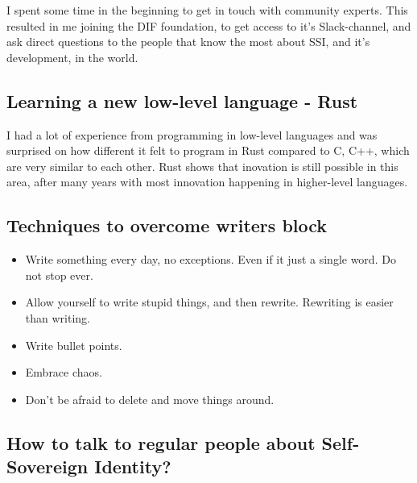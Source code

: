 I spent some time in the beginning to get in touch with community experts. This resulted in me joining the DIF foundation, to get access to it's Slack-channel, and ask direct questions to the people that know the most about SSI, and it's development, in the world.

\subsection{Learning a new low-level language - Rust}

I had a lot of experience from programming in low-level languages and was surprised on how different it felt to program in Rust compared to C, C++, which are very similar to each other. Rust shows that inovation is still possible in this area, after many years with most innovation happening in higher-level languages.

\subsection{Techniques to overcome writers block}
\begin{itemize}
    \item Write something every day, no exceptions. Even if it just a single word. Do not stop ever.
    \item Allow yourself to write stupid things, and then rewrite. Rewriting is easier than writing.
    \item Write bullet points.
    \item Embrace chaos.
    \item Don't be afraid to delete and move things around.
\end{itemize}


\newpage

\subsection{How to talk to regular people about Self-Sovereign Identity?}

